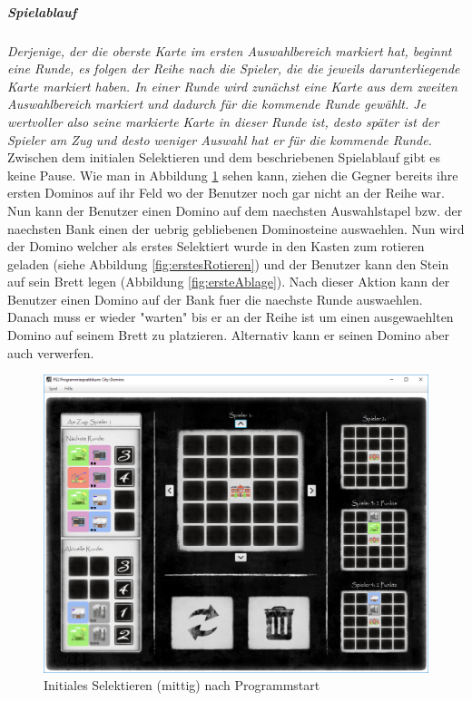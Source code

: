 \subparagraph{Spielablauf}
\emph{Derjenige, der die oberste Karte im ersten Auswahlbereich markiert hat, beginnt eine Runde, es folgen der Reihe
nach die Spieler, die die jeweils darunterliegende Karte markiert haben. In einer Runde wird zunächst eine Karte
aus dem zweiten Auswahlbereich markiert und dadurch für die kommende Runde gewählt. Je wertvoller also seine
markierte Karte in dieser Runde ist, desto später ist der Spieler am Zug und desto weniger Auswahl hat er für die
kommende Runde.}
\cite{aufgabenstellung}
Zwischen dem initialen Selektieren und dem beschriebenen Spielablauf gibt es keine Pause. Wie man in Abbildung \ref{fig:initialesSelektierenMittig} sehen kann, ziehen die Gegner bereits ihre ersten Dominos auf ihr Feld wo der Benutzer noch gar nicht an der Reihe war. Nun kann der Benutzer einen Domino auf dem naechsten Auswahlstapel bzw. der naechsten Bank einen der uebrig gebliebenen Dominosteine auswaehlen. Nun wird der Domino welcher als erstes Selektiert wurde in den Kasten zum rotieren geladen (siehe Abbildung \ref{fig:erstesRotieren}) und der Benutzer kann den Stein auf sein Brett legen (Abbildung \ref{fig:ersteAblage}). Nach dieser Aktion kann der Benutzer einen Domino auf der Bank fuer die naechste Runde auswaehlen. Danach muss er wieder "warten" bis er an der Reihe ist um einen ausgewaehlten Domino auf seinem Brett zu platzieren. Alternativ kann er seinen Domino aber auch verwerfen.

\begin{figure}
	\centering
	\includegraphics{screenshots/screenshot_InitialesSelektieren2.png}
	\caption[Initiales Selektieren - mittig]{Initiales Selektieren (mittig) nach Programmstart}
	\label{fig:initialesSelektierenMittig}
\end{figure}


